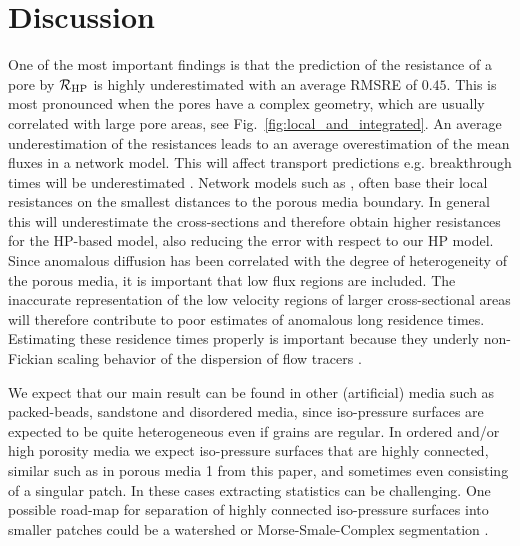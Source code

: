 \documentclass[draft]{agujournal2019}
\begin{document}
\section{Discussion}

One of the most important findings is that the prediction of the resistance of a pore by $\mathcal{R}_{\rm{HP}}$ is highly underestimated with an average RMSRE of $0.45$. This is most pronounced when the pores have a complex geometry, which are usually correlated with large pore areas, see Fig.~\ref{fig:local_and_integrated}. An average underestimation of the resistances leads to an average overestimation of the mean fluxes in a network model. This will affect transport predictions e.g. breakthrough times will be underestimated \cite{dentz_mechanisms_2018}. Network models such as \cite{alim_local_2017}, often base their local resistances on the smallest distances to the porous media boundary. In general this will underestimate the cross-sections and therefore obtain higher resistances for the HP-based model, also reducing the error with respect to our HP model. Since anomalous diffusion has been correlated with the degree of heterogeneity of the porous media, it is important that low flux regions are included. The inaccurate representation of the low velocity regions of larger cross-sectional areas will therefore contribute to poor estimates of anomalous long residence times. Estimating these residence times properly is important because they underly non-Fickian scaling behavior of the dispersion of flow tracers \cite{dentz_mechanisms_2018,dentz_delay_2006}.

We expect that our main result can be found in other (artificial) media such as packed-beads, sandstone and disordered media, since iso-pressure surfaces are expected to be quite heterogeneous even if grains are regular. In ordered and/or high porosity media we expect iso-pressure surfaces that are highly connected, similar such as in porous media 1 from this paper, and sometimes even consisting of a singular patch. In these cases extracting statistics can be challenging. One possible road-map for separation of highly connected iso-pressure surfaces into smaller patches could be a watershed or Morse-Smale-Complex segmentation \cite{tierny_topology_2018}.
\end{document}
